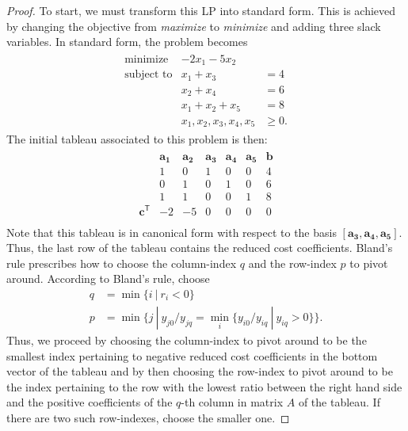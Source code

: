 \documentclass[12pt]{article}
\theoremstyle{definition}
\newcommand{\vect}[1]{\boldsymbol{#1}}
\newcommand{\tran}{\mathsf{T}}
\begin{document}
\begin{proof}
  To start, we must transform this LP into standard form. This is achieved by
  changing the objective from \textit{maximize} to \textit{minimize} and
  adding three slack variables. In standard form,
  the problem becomes
  \begin{align*}
    \begin{array}{rrl}
      \text{minimize} & -2x_1 -5x_2&\\
      \text{subject to} & x_1 + x_3 &= 4 \\
      & x_2 + x_4 &= 6 \\
      & x_1 + x_2 + x_5 &= 8 \\
      & x_1, x_2, x_3, x_4, x_5 &\geq 0.
    \end{array}
  \end{align*}
  The initial tableau associated to this problem is then:
  \begin{align*}
    \begin{matrix}
      & \vect{a_1} & \vect{a_2} & \vect{a_3} & \vect{a_4} & \vect{a_5} & \vect{b} \\
      & 1 & 0 & 1 & 0 & 0 & 4 \\
      & 0 & 1 & 0 & 1 & 0 & 6 \\
      & 1 & 1 & 0 & 0 & 1 & 8 \\
      \vect{c}^\tran & -2 & -5  & 0 & 0 & 0 & 0 \\
    \end{matrix}
  \end{align*}
  Note that this tableau is in canonical form with respect to the basis
  $[\vect{a_3}, \vect{a_4}, \vect{a_5}]$. Thus, the last row of the tableau
  contains the reduced cost coefficients. Bland's rule prescribes how to choose
  the column-index $q$ and the row-index $p$ to pivot around. According to
  Bland's rule, choose
  \begin{align*}
    q &= \min\{i\ |\ r_i < 0  \}\\
    p &= \min\{j\ |\ y_{j0}/y_{jq} = \min_i\{y_{i0}/y_{iq}\ |\ y_{iq} > 0\} \}.
  \end{align*}
  Thus, we proceed by choosing the column-index to pivot around to be the smallest
  index pertaining to negative reduced cost coefficients in the bottom vector of the
  tableau and by then choosing the row-index to pivot around to be the
  index pertaining to the row with the lowest ratio between the right hand side and
  the positive coefficients of the $q$-th column in matrix $A$ of the tableau.
  If there are two such row-indexes, choose the smaller one.


\end{proof}
\end{document}
